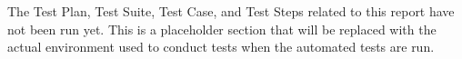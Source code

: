 The Test Plan, Test Suite, Test Case, and Test Steps related to this report have
not been run yet.  This is a placeholder section that will be replaced with the
actual environment used to conduct tests when the automated tests are run.

